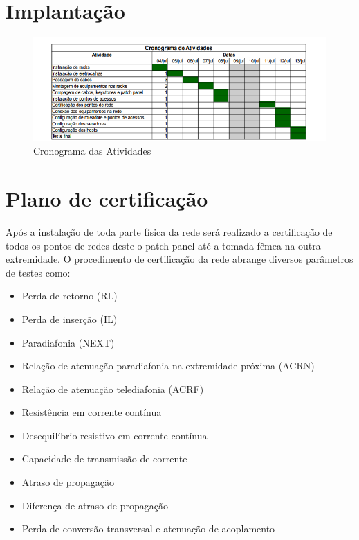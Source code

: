 \documentclass[	DIV=calc,%
							paper=a4,%
							fontsize=12pt,%
							onecolumn]{scrartcl}	 					%
\begin{document}
\section{Implantação}

\begin{figure}
	\centering
	\includegraphics[height=\textwidth]{cronograma}
	\caption{Cronograma das Atividades}
	\label{cronograma}
\end{figure}


\section{Plano de certificação}

Após a instalação de toda parte física da rede será realizado a certificação de todos os pontos de redes deste o patch panel até a tomada fêmea na outra extremidade. O procedimento de certificação da rede abrange diversos parâmetros de testes como:
\begin{itemize}
	\item Perda de retorno (RL) 
	\item Perda de inserção (IL)
	\item Paradiafonia (NEXT)
	\item Relação de atenuação paradiafonia na extremidade próxima (ACRN)
	\item Relação de atenuação telediafonia (ACRF)
	\item Resistência em corrente contínua
	\item Desequilíbrio resistivo em corrente contínua
	\item Capacidade de transmissão de corrente
	\item Atraso de propagação
	\item Diferença de atraso de propagação
	\item Perda de conversão transversal e atenuação de acoplamento
\end{itemize}
\end{document}
